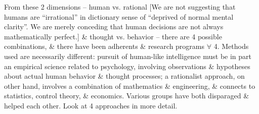 \documentclass{article}
\begin{document}
\begin{itemize}
\begin{itemize}
\begin{itemize}
			From these 2 dimensions -- human vs. rational [We are not suggesting that humans are ``irrational'' in dictionary sense of ``deprived of normal mental clarity''. We are merely conceding that human decisions are not always mathematically perfect.] \& thought vs. behavior -- there are 4 possible combinations, \& there have been adherents \& research programs $\forall$ 4. Methods used are necessarily different: pursuit of human-like intelligence must be in part an empirical science related to psychology, involving observations \& hypotheses about actual human behavior \& thought processes; a rationalist approach, on other hand, involves a combination of mathematics \& engineering, \& connects to statistics, control theory, \& economics. Various groups have both disparaged \& helped each other. Look at 4 approaches in more detail.


\end{itemize}
\end{itemize}
\end{itemize}
\end{document}
